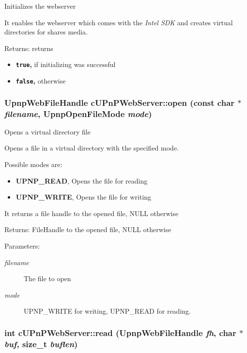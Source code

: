 Initializes the webserver

It enables the webserver which comes with the {\em Intel SDK\/} and creates virtual directories for shares media.

\begin{Desc}
\item[Returns:]returns\begin{itemize}
\item {\bf {\tt true},} if initializing was successful\item {\bf {\tt false},} otherwise \end{itemize}
\end{Desc}
\hypertarget{classcUPnPWebServer_5f9d44729464cab3e8bf74e4457dbb24}{
\subsubsection[{open}]{\setlength{\rightskip}{0pt plus 5cm}UpnpWebFileHandle cUPnPWebServer::open (const char $\ast$ {\em filename}, \/  UpnpOpenFileMode {\em mode})}}
\label{classcUPnPWebServer_5f9d44729464cab3e8bf74e4457dbb24}


Opens a virtual directory file

Opens a file in a virtual directory with the specified mode.

Possible modes are:\begin{itemize}
\item {\bf UPNP\_\-READ}, Opens the file for reading\item {\bf UPNP\_\-WRITE}, Opens the file for writing\end{itemize}


It returns a file handle to the opened file, NULL otherwise

\begin{Desc}
\item[Returns:]FileHandle to the opened file, NULL otherwise \end{Desc}
\begin{Desc}
\item[Parameters:]
\begin{description}
\item[{\em filename}]The file to open \item[{\em mode}]UPNP\_\-WRITE for writing, UPNP\_\-READ for reading. \end{description}
\end{Desc}
\hypertarget{classcUPnPWebServer_7bdaa921f11a40da60c5fc99f577a017}{
\subsubsection[{read}]{\setlength{\rightskip}{0pt plus 5cm}int cUPnPWebServer::read (UpnpWebFileHandle {\em fh}, \/  char $\ast$ {\em buf}, \/  size\_\-t {\em buflen})}}
\label{classcUPnPWebServer_7bdaa921f11a40da60c5fc99f577a017}


